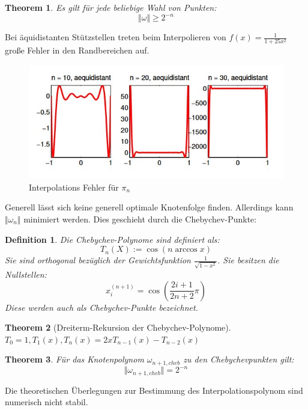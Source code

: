 \documentclass[10pt,a4paper]{article}
\newtheorem{theorem}{Theorem}
\newtheorem{definition}{Definition}
\begin{document}
	\begin{theorem}
		Es gilt für jede beliebige Wahl von Punkten:
		$$\Vert\omega\Vert \geq 2^{-n}$$
	\end{theorem}
	Bei äquidistanten Stützstellen treten beim Interpolieren von $f(x) = \frac{1}{1+25x^2}$ große Fehler in den Randbereichen auf.
	\begin{figure}
		\centering
		\caption{Interpolations Fehler für $\pi_n$}
		\includegraphics[scale=0.8]{rungespikes.jpg}
	\end{figure}
	Generell lässt sich keine generell optimale Knotenfolge finden. Allerdings kann $\Vert\omega_n\Vert$ minimiert werden. Dies geschieht durch die Chebychev-Punkte:
	\begin{definition}
		Die Chebychev-Polynome sind definiert als:
		$$T_n (X) := \cos(n\arccos x)$$
		Sie sind orthogonal bezüglich der Gewichtsfunktion $\frac{1}{\sqrt{1-x^2}}$. Sie besitzen die Nullstellen:
		$$x_i^{(n+1)}= \cos(\frac{2i+1}{2n+2}\pi)$$
		Diese werden auch als Chebychev-Punkte bezeichnet.
	\end{definition}
	\begin{theorem}[Dreiterm-Rekursion der Chebychev-Polynome]
		$T_0 = 1, T_1(x), T_n(x) = 2xT_{n-1}(x)-T_{n-2}(x)$
	\end{theorem}
	\begin{theorem}
		Für das Knotenpolynom $\omega_{n+1, cheb}$ zu den Chebychevpunkten gilt:
		$$\Vert\omega_{n+1,cheb} \Vert= 2^{-n}$$
	\end{theorem}
	Die theoretischen Überlegungen zur Bestimmung des Interpolationspolynom sind numerisch nicht stabil.
\end{document}
